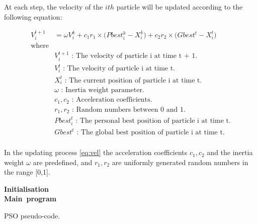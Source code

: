 \documentclass{pdfmx4020}
\begin{document}
    At each step, the velocity of the $ith$ particle will be updated according to the following equation:

    \begin{equation} \label{eq:vel}
      \begin{split}
        V_{i}^{t+1} & = \omega V_{i}^{k} + c_1 r_1 \times \Big( Pbest_{i}^{k} - X_{i}^{k} \Big) + c_2 r_2 \times \Big( Gbest^{t} - X_{i}^{t} \Big) \\
        \text{where} & \\
        & V_i^{t+1} \text{ : The velocity of particle i at time t + 1.} \\
        & V_i^t \text{ : The velocity of particle i at time t.} \\
        & X_i^t \text{ : The current position of particle i at time t.} \\
        & \omega \text{ : Inertia weight parameter.} \\
        & c_1, c_2 \text{ : Acceleration coefficients.} \\
        & r_1, r_2 \text{ : Random numbers between 0 and 1.} \\
        & Pbest_i^t \text{ : The personal best position of particle i at time t.} \\
        & Gbest^t \text{ : The global best position of particle i at time t.} \\
      \end{split}
    \end{equation}

    In the updating process \ref{eq:vel} the acceleration coefficients $c_1, c_2$ and the inertia weight $\omega$ are predefined, and $r_1, r_2$ are uniformly generated random numbers in the range [0,1].

    \begin{algorithm}[H] \label{eq:pso}
      \mbox{\textbf{Initialisation}} \\
      \mbox{\textbf{Main program}} \\      
      \caption{PSO pseudo-code.}
    \end{algorithm}
    
\end{document}
